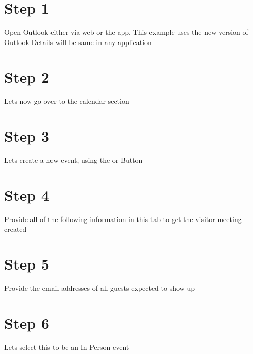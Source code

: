 \documentclass{../lib/lib-en}
\begin{document}

\newpage
\newpage
\section*{\centering Step 1}
Open Outlook either via web or the app, 
This example uses the new version of Outlook Details will be same in any application 


\newpage
\section*{\centering Step 2}
Lets now go over to the calendar section 


\newpage
\section*{\centering Step 3}
Lets create a new event, using the  or  Button


\newpage
\section*{\centering Step 4}
Provide all of the following information in this tab to get the visitor meeting created


\newpage
\section*{\centering Step 5}
Provide the email addresses of all guests expected to show up


\newpage
\section*{\centering Step 6}
 Lets select this to be an In-Person event
\end{document}
